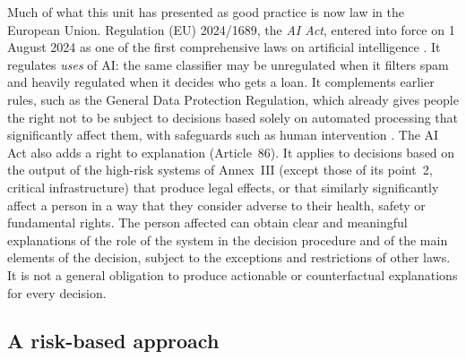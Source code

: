 Much of what this unit has presented as good practice is now law in the European Union. Regulation (EU)
2024/1689, the \emph{AI Act}, entered into force on 1 August 2024 as one of the first comprehensive laws on artificial
intelligence \citep{eu2024aiact}. It regulates \emph{uses} of AI: the same classifier may be
unregulated when it filters spam and heavily regulated when it decides who gets a loan. It complements earlier
rules, such as the General Data Protection Regulation, which already gives people the right not to be subject
to decisions based solely on automated processing that significantly affect them, with safeguards such as
human intervention \citep{gdpr2016,wachter2017right}. The AI Act also adds a right to explanation (Article~86). It applies to decisions based on the output of the high-risk systems of Annex~III
(except those of its point~2, critical infrastructure) that produce legal effects, or that similarly significantly affect a
person in a way that they consider adverse to their health, safety or fundamental rights. The person affected can obtain clear and meaningful explanations of the role of the system in the decision procedure and of the main elements
of the decision, subject to the exceptions and restrictions of other laws. It is not a general obligation
to produce actionable or counterfactual explanations for every decision.

\subsection{A risk-based approach}

